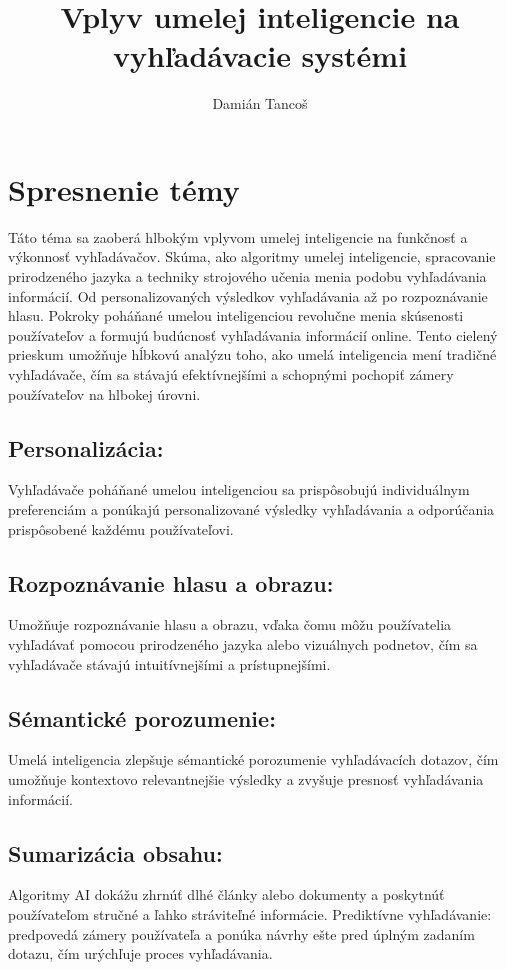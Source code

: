 \documentclass{article}
\title{Vplyv umelej inteligencie na vyhľadávacie systémi}
\author{Damián Tancoš}
\begin{document}
\maketitle

\section{Spresnenie témy}

Táto téma sa zaoberá hlbokým vplyvom umelej inteligencie na funkčnosť a výkonnosť vyhľadávačov. Skúma, ako algoritmy umelej inteligencie, spracovanie prirodzeného jazyka a techniky strojového učenia menia podobu vyhľadávania informácií. Od personalizovaných výsledkov vyhľadávania až po rozpoznávanie hlasu. Pokroky poháňané umelou inteligenciou revolučne menia skúsenosti používateľov a formujú budúcnosť vyhľadávania informácií online. Tento cielený prieskum umožňuje hĺbkovú analýzu toho, ako umelá inteligencia mení tradičné vyhľadávače, čím sa stávajú efektívnejšími a schopnými pochopiť zámery používateľov na hlbokej úrovni.

\subsection{Personalizácia:}
 Vyhľadávače poháňané umelou inteligenciou sa prispôsobujú individuálnym preferenciám a ponúkajú personalizované výsledky vyhľadávania a odporúčania prispôsobené každému používateľovi.

\subsection{Rozpoznávanie hlasu a obrazu:}
 Umožňuje rozpoznávanie hlasu a obrazu, vďaka čomu môžu používatelia vyhľadávať pomocou prirodzeného jazyka alebo vizuálnych podnetov, čím sa vyhľadávače stávajú intuitívnejšími a prístupnejšími.

\subsection{Sémantické porozumenie:}
Umelá inteligencia zlepšuje sémantické porozumenie vyhľadávacích dotazov, čím umožňuje kontextovo relevantnejšie výsledky a zvyšuje presnosť vyhľadávania informácií.

\subsection{Sumarizácia obsahu:}
 Algoritmy AI dokážu zhrnúť dlhé články alebo dokumenty a poskytnúť používateľom stručné a ľahko stráviteľné informácie.
Prediktívne vyhľadávanie: predpovedá zámery používateľa a ponúka návrhy ešte pred úplným zadaním dotazu, čím urýchľuje proces vyhľadávania.
\end{document}
